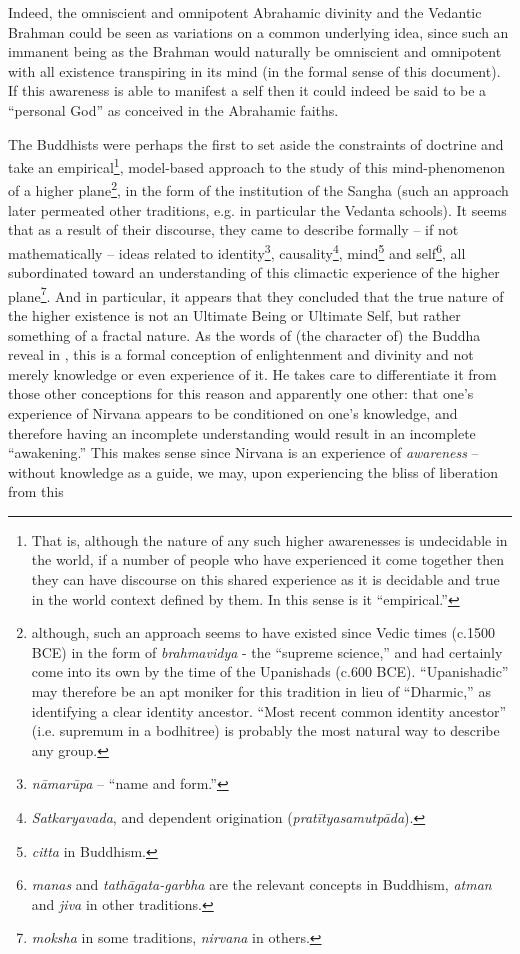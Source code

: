 \documentclass[pra,twocolumn,groupedaddress,10pt]{revtex4}
\theoremstyle{definition}
\begin{document}
Indeed, the omniscient and omnipotent Abrahamic divinity and the Vedantic Brahman could be seen as variations on a common underlying idea, since such an immanent being as the Brahman would naturally be omniscient and omnipotent with all existence transpiring in its mind (in the formal sense of this document). If this awareness is able to manifest a self then it could indeed be said to be a ``personal God'' as conceived in the Abrahamic faiths.

The Buddhists were perhaps the first to set aside the constraints of doctrine and take an empirical\footnote{That is, although the nature of any such higher awarenesses is undecidable in the world, if a number of people who have experienced it come together then they can have discourse on this shared experience as it is decidable and true in the world context defined by them. In this sense is it ``empirical.''}, model-based approach to the study of this mind-phenomenon of a higher plane\footnote{although, such an approach seems to have existed since Vedic times (c.1500 BCE) in the form of \textit{brahmavidya} - the ``supreme science,''\cite{gita} and had certainly come into its own by the time of the Upanishads (c.600 BCE). ``Upanishadic'' may therefore be an apt moniker for this tradition in lieu of ``Dharmic,'' as identifying a clear identity ancestor. ``Most recent common identity ancestor'' (i.e. supremum in a bodhitree) is probably the most natural way to describe any group.}, in the form of the institution of the Sangha (such an approach later permeated other traditions, e.g. in particular the Vedanta schools). It seems that as a result of their discourse, they came to describe formally -- if not mathematically -- ideas related to identity\footnote{\textit{n\={a}mar\={u}pa} -- ``name and form.''}, causality\footnote{\textit{Satkaryavada}, and dependent origination (\textit{prat\={i}tyasamutp\={a}da}).}, mind\footnote{\textit{citta} in Buddhism.} and self\footnote{\textit{manas} and \textit{tath\={a}gata-garbha} are the relevant concepts in Buddhism, \textit{atman} and \textit{jiva} in other traditions.}, all subordinated toward an understanding of this climactic experience of the higher plane\footnote{\textit{moksha} in some traditions, \textit{nirvana} in others.}. And in particular, it appears that they concluded that the true nature of the higher existence is not an Ultimate Being or Ultimate Self, but rather something of a fractal nature. As the words of (the character of) the Buddha reveal in \cite{lankavatara}, this is a formal conception of enlightenment and divinity and not merely knowledge or even experience of it. He takes care to differentiate it from those other conceptions for this reason and apparently one other: that one's experience of Nirvana appears to be conditioned on one's knowledge, and therefore having an incomplete understanding would result in an incomplete ``awakening.'' This makes sense since Nirvana is an experience of \textit{awareness} -- without knowledge as a guide, we may, upon experiencing the bliss of liberation from this 
\end{document}
